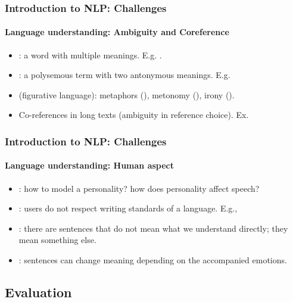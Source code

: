 \documentclass[xcolor=table]{beamer}
\begin{document}
\begin{frame}
\frametitle{Introduction to NLP: Challenges}
\framesubtitle{Language understanding: Ambiguity and Coreference}

\begin{itemize}
	\item {}: a word with multiple meanings.
	E.g. .
	\item {}: a polysemous term with two antonymous meanings.
	E.g. 
	\item {} (figurative language): metaphors (), metonomy (), irony ().
	\item Co-references in long texts (ambiguity in reference choice).
	Ex. 
\end{itemize}

\end{frame}

\begin{frame}
\frametitle{Introduction to NLP: Challenges}
\framesubtitle{Language understanding: Human aspect}

\begin{itemize}
	\item {}: how to model a personality? how does personality affect speech?
	\item {}: users do not respect writing standards of a language. E.g., 
	\item {}: there are sentences that do not mean what we understand directly; they mean something else.
	\item {}: sentences can change meaning depending on the accompanied emotions.
\end{itemize}

\end{frame}


\subsection{Evaluation}
\end{document}
